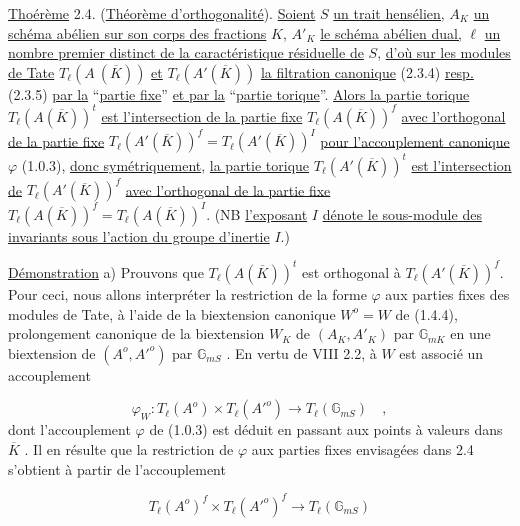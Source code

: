 \underline{Thoérème} 2.4. (\underline{Théorème d'orthogonalité}). \underline{Soient} $S$ \underline{un trait hensélien,} $A_K$ \underline{un schéma abélien sur son corps des fractions} $K$, $A'_K$ \underline{le schéma abélien dual,} $\ell$ \underline{un nombre premier distinct de la caractéristique résiduelle de} $S$, \underline{d'où sur les modules de Tate} $T_\ell(A\ (\overline{K}))$ \underline{et} $T_\ell(A'(\overline{K}))$ \underline{la filtration canonique} (2.3.4) \underline{resp.} (2.3.5) \underline{par la} ``\underline{partie fixe}'' \underline{et par la} ``\underline{partie torique}''. \underline{Alors la partie torique} $T_\ell(A(\overline{K}))^t$ \underline{est l'intersection de la partie fixe} $T_\ell(A(\overline{K}))^f$ \underline{avec l'orthogonal de la partie fixe} $T_\ell(A'(\overline{K}))^f = T_\ell(A'(\overline{K}))^I$ \underline{pour l'accouplement canonique} $\varphi$ (1.0.3), \underline{donc symétriquement}, \underline{la partie torique} $T_\ell(A'(\overline{K}))^t$ \underline{est l'intersection de} $T_\ell(A'(\overline{K}))^f$ \underline{avec l'orthogonal de la partie fixe} $T_\ell(A(\overline{K}))^f = T_\ell(A(\overline{K}))^I$. (NB \underline{l'exposant} $I$ \underline{dénote le sous-module des invariants sous l'action du groupe d'inertie} $I$.)

\underline{Démonstration} \quad a) \quad Prouvons que $T_\ell(A(\overline{K}))^t$ est orthogonal à $T_\ell(A'(\overline{K}))^f$. Pour ceci, nous allons interpréter la restriction de la forme $\varphi$ aux parties fixes des modules de Tate, à l'aide de la biextension canonique $W^o = W$ de (1.4.4), prolongement canonique de la biextension $W_K$ de $(A_K , A'_K)$ par $\mathbb{G}_{mK}$ en une biextension de $(A^o , {A'}^o)$ par $\mathbb{G}_{mS}$ . En vertu de VIII 2.2, à $W$ est associé un accouplement

\begin{equation}\tag{2.4.1}
\varphi_W : T_\ell(A^o) \times T_\ell({A'}^o) \longrightarrow T_\ell(\mathbb{G}_{mS}) \quad ,
\end{equation}
dont l'accouplement $\varphi$ de (1.0.3) est déduit en passant aux points à valeurs dans $\overline{K}$ . Il en résulte que la restriction de $\varphi$ aux parties fixes envisagées dans 2.4 s'obtient à partir de l'accouplement

\begin{equation}\tag{2.4.2}
T_\ell(A^o)^f \times T_\ell({A'}^o)^f \longrightarrow T_\ell(\mathbb{G}_{mS})
\end{equation}

